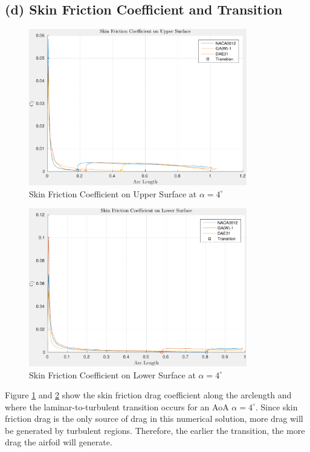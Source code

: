 \documentclass[letterpaper,12pt,]{article}
\begin{document}
\subsection*{(d) Skin Friction Coefficient and Transition}
\begin{figure}[!th]
    \centering
    \includegraphics[width = 0.85\textwidth]{./figures/q4uppercf.pdf}
    \caption{Skin Friction Coefficient on Upper Surface at $\alpha = 4^\circ$}
    \label{fig:q4dupper}
\end{figure}

\begin{figure}[!th]
    \centering
    \includegraphics[width = 0.85\textwidth]{./figures/q4lowercf.pdf}
    \caption{Skin Friction Coefficient on Lower Surface at $\alpha = 4^\circ$}
    \label{fig:q4dlower}
\end{figure}

Figure \ref{fig:q4dupper} and \ref{fig:q4dlower} show the skin friction drag coefficient along the arclength and where the laminar-to-turbulent transition occurs for an AoA $\alpha = 4^\circ$.
Since skin friction drag is the only source of drag in this numerical solution, more drag will be generated by turbulent regions.
Therefore, the earlier the transition, the more drag the airfoil will generate.
\end{document}
